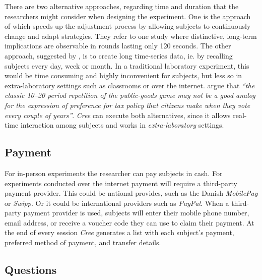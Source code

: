 \documentclass[preprint, 12pt]{elsarticle}
\newcommand{\Cree}{\emph{Cree}\xspace}
\begin{document}
There are two alternative approaches, regarding time and duration that the researchers might consider when designing the experiment. One is the approach of \citet*{Pettit_Friedman_Kephart_Oprea_2014} which speeds up the adjustment process by allowing subjects to continuously change and adapt strategies. They refer to one study where distinctive, long-term implications are observable in rounds lasting only 120 seconds. The other approach, suggested by \cite{Charness_Gneezy_Kuhn_2013}, is to create long time-series data, ie. by recalling subjects every day, week or month. In a traditional laboratory experiment, this would be time consuming and highly inconvenient for subjects, but less so in extra-laboratory settings such as classrooms or over the internet. \citet[p. 96]{Charness_Gneezy_Kuhn_2013} argue that \emph{``the classic 10–20 period repetition of the public-goods game may not be a good analog for the expression of preference for tax policy that citizens make when they vote every couple of years''}. \Cree can execute both alternatives, since it allows real-time interaction among subjects and works in \emph{extra-laboratory} settings.

\subsection{Payment}

For in-person experiments the researcher can pay subjects in cash. For experiments conducted over the internet payment will require a third-party payment provider. This could be national provides, such as the Danish \emph{MobilePay} or \emph{Swipp}. Or it could be international providers such as \emph{PayPal}. When a third-party payment provider is used, subjects will enter their mobile phone number, email address, or receive a voucher code they can use to claim their payment. At the end of every session \Cree generates a list with each subject's payment, preferred method of payment, and transfer details.

\subsection{Questions}
\end{document}
